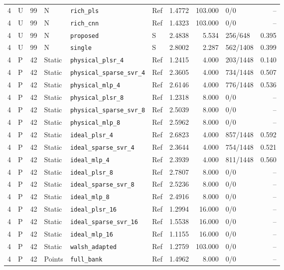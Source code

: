 \documentclass[10pt,a4paper]{article}
\begin{document}
\begin{longtable}{rlrlllrrlr}
4 & U & 99 & N & \texttt{rich\_pls} & Ref & 1.4772 & 103.000 & 0/0 & -- \\
4 & U & 99 & N & \texttt{rich\_cnn} & Ref & 1.4323 & 103.000 & 0/0 & -- \\
4 & U & 99 & N & \texttt{proposed} & S & 2.4838 & 5.534 & 256/648 & 0.395 \\
4 & U & 99 & N & \texttt{single} & S & 2.8002 & 2.287 & 562/1408 & 0.399 \\
4 & P & 42 & Static & \texttt{physical\_plsr\_4} & Ref & 1.2415 & 4.000 & 203/1448 & 0.140 \\
4 & P & 42 & Static & \texttt{physical\_sparse\_svr\_4} & Ref & 2.3605 & 4.000 & 734/1448 & 0.507 \\
4 & P & 42 & Static & \texttt{physical\_mlp\_4} & Ref & 2.6146 & 4.000 & 776/1448 & 0.536 \\
4 & P & 42 & Static & \texttt{physical\_plsr\_8} & Ref & 1.2318 & 8.000 & 0/0 & -- \\
4 & P & 42 & Static & \texttt{physical\_sparse\_svr\_8} & Ref & 2.5039 & 8.000 & 0/0 & -- \\
4 & P & 42 & Static & \texttt{physical\_mlp\_8} & Ref & 2.5962 & 8.000 & 0/0 & -- \\
4 & P & 42 & Static & \texttt{ideal\_plsr\_4} & Ref & 2.6823 & 4.000 & 857/1448 & 0.592 \\
4 & P & 42 & Static & \texttt{ideal\_sparse\_svr\_4} & Ref & 2.3644 & 4.000 & 754/1448 & 0.521 \\
4 & P & 42 & Static & \texttt{ideal\_mlp\_4} & Ref & 2.3939 & 4.000 & 811/1448 & 0.560 \\
4 & P & 42 & Static & \texttt{ideal\_plsr\_8} & Ref & 2.7807 & 8.000 & 0/0 & -- \\
4 & P & 42 & Static & \texttt{ideal\_sparse\_svr\_8} & Ref & 2.5236 & 8.000 & 0/0 & -- \\
4 & P & 42 & Static & \texttt{ideal\_mlp\_8} & Ref & 2.4916 & 8.000 & 0/0 & -- \\
4 & P & 42 & Static & \texttt{ideal\_plsr\_16} & Ref & 1.2994 & 16.000 & 0/0 & -- \\
4 & P & 42 & Static & \texttt{ideal\_sparse\_svr\_16} & Ref & 1.5538 & 16.000 & 0/0 & -- \\
4 & P & 42 & Static & \texttt{ideal\_mlp\_16} & Ref & 1.1155 & 16.000 & 0/0 & -- \\
4 & P & 42 & Static & \texttt{walsh\_adapted} & Ref & 1.2759 & 103.000 & 0/0 & -- \\
4 & P & 42 & Points & \texttt{full\_bank} & Ref & 1.4962 & 8.000 & 0/0 & -- \\

\end{longtable}
\end{document}
